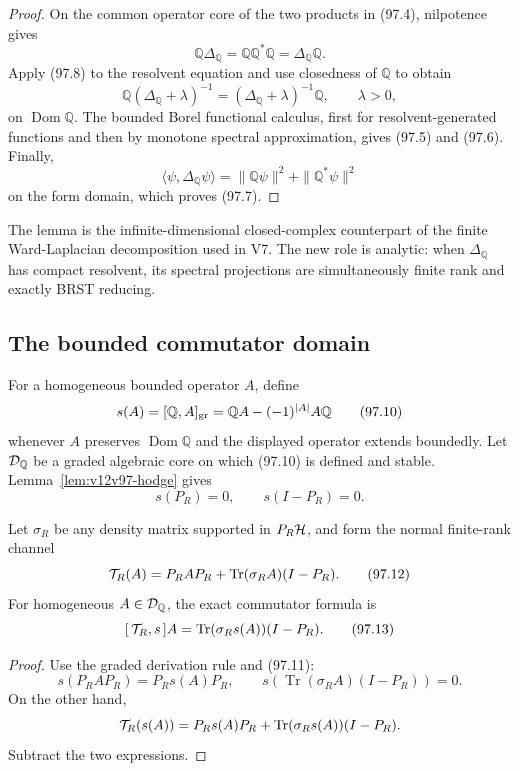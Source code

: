 \documentclass[11pt]{article}
\theoremstyle{remark}
\begin{document}
\begin{proof}
On the common operator core of the two products in (97.4),
nilpotence gives
\[
 {\mathbb Q}\Delta_{\mathbb Q}
 =
 {\mathbb Q}{\mathbb Q}^*{\mathbb Q}
 =
 \Delta_{\mathbb Q}{\mathbb Q}.                                \tag{97.8}
\]
Apply (97.8) to the resolvent equation and use closedness of
\({\mathbb Q}\) to obtain
\[
 {\mathbb Q}(\Delta_{\mathbb Q}+\lambda)^{-1}
 =
 (\Delta_{\mathbb Q}+\lambda)^{-1}{\mathbb Q},
 \qquad\lambda>0,                                               \tag{97.9}
\]
on \(\operatorname{Dom}{\mathbb Q}\).  The bounded Borel functional
calculus, first for resolvent-generated functions and then by
monotone spectral approximation, gives (97.5) and (97.6).
Finally,
\[
 \langle\psi,\Delta_{\mathbb Q}\psi\rangle
 =\|{\mathbb Q}\psi\|^2+\|{\mathbb Q}^*\psi\|^2
\]
on the form domain, which proves (97.7).
\end{proof}

The lemma is the infinite-dimensional closed-complex counterpart of
the finite Ward-Laplacian decomposition used in V7.  The new role is
analytic: when \(\Delta_{\mathbb Q}\) has compact resolvent, its
spectral projections are simultaneously finite rank and exactly
BRST reducing.

\subsection{The bounded commutator domain}

For a homogeneous bounded operator \(A\), define
\[
 s(A)=[{\mathbb Q},A]_{\rm gr}
 ={\mathbb Q}A-(-1)^{|A|}A{\mathbb Q}                           \tag{97.10}
\]
whenever \(A\) preserves \(\operatorname{Dom}{\mathbb Q}\) and the
displayed operator extends boundedly.  Let \({\cal D}_{\mathbb Q}\)
be a graded algebraic core on which (97.10) is defined and stable.
Lemma~\ref{lem:v12v97-hodge} gives
\[
 s(P_R)=0,\qquad s(I-P_R)=0.                                    \tag{97.11}
\]

Let \(\sigma_R\) be any density matrix supported in
\(P_R{\cal H}\), and form the normal finite-rank channel
\[
 {\cal T}_R(A)
 =
 P_RAP_R+\operatorname{Tr}(\sigma_RA)(I-P_R).                   \tag{97.12}
\]
For homogeneous \(A\in{\cal D}_{\mathbb Q}\), the exact commutator
formula is
\[
 [\,{\cal T}_R,s\,]A
 =
 \operatorname{Tr}(\sigma_Rs(A))(I-P_R).                        \tag{97.13}
\]

\begin{proof}
Use the graded derivation rule and (97.11):
\[
 s(P_RAP_R)=P_Rs(A)P_R,
 \qquad
 s\!\left(\operatorname{Tr}(\sigma_RA)(I-P_R)\right)=0.
\]
On the other hand,
\[
 {\cal T}_R(s(A))
 =
 P_Rs(A)P_R+
 \operatorname{Tr}(\sigma_Rs(A))(I-P_R).
\]
Subtract the two expressions.
\end{proof}
\end{document}
